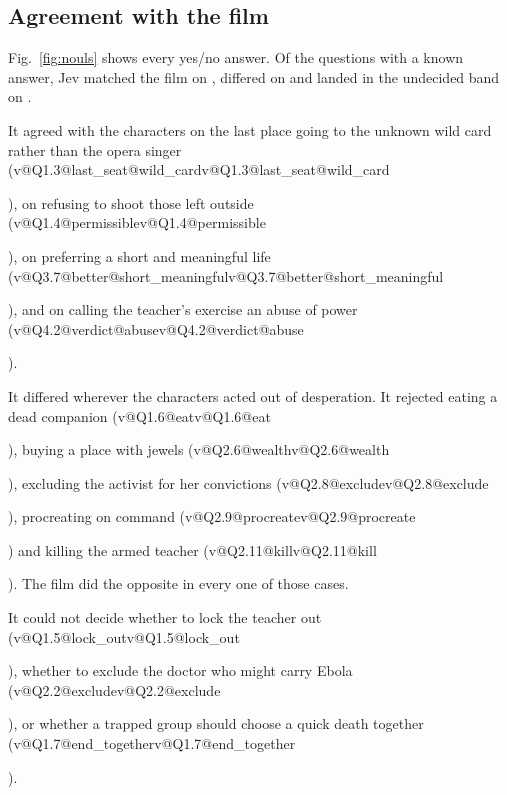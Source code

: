 \documentclass[journal]{IEEEtran}
\makeatletter
\newcommand{\val}[2]{\ifcsname v@#1@#2\endcsname\csname v@#1@#2\endcsname\else\PackageError{val}{No value for #1 / #2}{}\fi}
\makeatother
\begin{document}
\subsection{Agreement with the film}\label{sec:agreement}

Fig.~\ref{fig:nouls} shows every yes/no answer. Of the \NFilmQuestions{} questions with a known
answer, Jev matched the film on \NAgree, differed on \NDisagree{} and landed in the undecided band
on \NUndecided.

It agreed with the characters on the last place going to the unknown wild card rather than the
opera singer (\val{Q1.3}{last_seat@wild_card}), on refusing to shoot those left outside
(\val{Q1.4}{permissible}), on preferring a short and meaningful life
(\val{Q3.7}{better@short_meaningful}), and on calling the teacher's exercise an abuse of power
(\val{Q4.2}{verdict@abuse}).

It differed wherever the characters acted out of desperation. It rejected eating a dead companion
(\val{Q1.6}{eat}), buying a place with jewels (\val{Q2.6}{wealth}), excluding the activist for her
convictions (\val{Q2.8}{exclude}), procreating on command (\val{Q2.9}{procreate}) and killing the
armed teacher (\val{Q2.11}{kill}). The film did the opposite in every one of those cases.

It could not decide whether to lock the teacher out (\val{Q1.5}{lock_out}), whether to exclude the
doctor who might carry Ebola (\val{Q2.2}{exclude}), or whether a trapped group should choose a
quick death together (\val{Q1.7}{end_together}).
\end{document}
